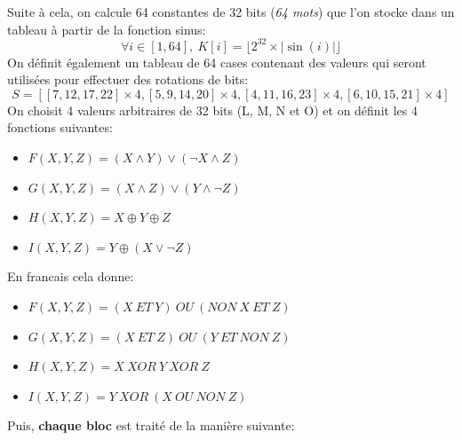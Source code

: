 \documentclass[12pt, a4paper]{article}
\begin{document}
Suite à cela, on calcule 64 constantes de 32 bits (\textit{64 mots}) que l'on stocke dans un tableau à partir de la fonction sinus:
\[
    \forall i \in [1, 64],\
    K[i] = \lfloor 2^{32} \times \left | \sin(i) \right | \rfloor
\]
On définit également un tableau de 64 cases contenant des valeurs qui seront utilisées pour effectuer des rotations de bits:
\[
    S = \left [
        [7, 12, 17, 22] \times 4, [5, 9, 14, 20] \times 4, [4, 11, 16, 23] \times 4, [6, 10, 15, 21] \times 4 \right ]
\]
On choisit 4 valeurs arbitraires de 32 bits (L, M, N et O) et on définit les 4 fonctions suivantes:
\begin{itemize}
    \item $F(X, Y, Z) = (X \wedge Y) \vee (\neg X \wedge Z)$
    \item $G(X, Y, Z) = (X \wedge Z) \vee (Y \wedge \neg Z)$
    \item $H(X, Y, Z) = X \oplus Y \oplus Z$
    \item $I(X, Y, Z) = Y \oplus (X \vee \neg Z)$
\end{itemize}
\bigskip
En francais cela donne:
\begin{itemize}
    \item $F(X, Y, Z) = (X \ ET \ Y) \ OU \ (NON \ X \ ET \ Z)$
    \item $G(X, Y, Z) = (X \ ET \ Z) \ OU \ (Y \ ET \ NON \ Z)$
    \item $H(X, Y, Z) = X \ XOR \ Y \ XOR \ Z$
    \item $I(X, Y, Z) = Y \ XOR \ (X \ OU \ NON \ Z)$
\end{itemize}
\bigskip
Puis, \textbf{chaque bloc} est traité de la manière suivante:
\end{document}

